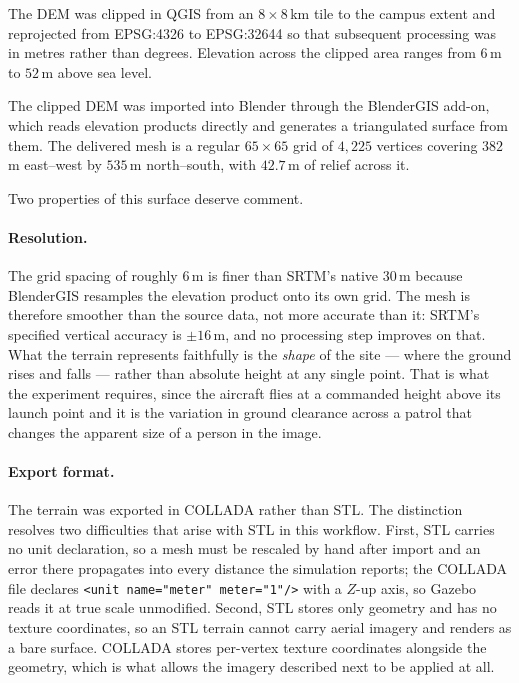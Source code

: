 The DEM was clipped in QGIS from an $8 \times 8$\,km tile to the campus
extent and reprojected from EPSG:4326 to EPSG:32644 so that subsequent
processing was in metres rather than degrees. Elevation across the clipped
area ranges from $6$\,m to $52$\,m above sea level.

The clipped DEM was imported into Blender through the BlenderGIS add-on,
which reads elevation products directly and generates a triangulated surface
from them. The delivered mesh is a regular $65 \times 65$ grid of $4{,}225$
vertices covering $382$\,m east--west by $535$\,m north--south, with
$42.7$\,m of relief across it.

Two properties of this surface deserve comment.

\paragraph{Resolution.}
The grid spacing of roughly $6$\,m is finer than SRTM's native $30$\,m
because BlenderGIS resamples the elevation product onto its own grid. The
mesh is therefore smoother than the source data, not more accurate than it:
SRTM's specified vertical accuracy is $\pm 16$\,m, and no processing step
improves on that. What the terrain represents faithfully is the \emph{shape}
of the site --- where the ground rises and falls --- rather than absolute
height at any single point. That is what the experiment requires, since the
aircraft flies at a commanded height above its launch point and it is the
variation in ground clearance across a patrol that changes the apparent size
of a person in the image.

\paragraph{Export format.}
The terrain was exported in COLLADA rather than STL. The distinction
resolves two difficulties that arise with STL in this workflow. First, STL
carries no unit declaration, so a mesh must be rescaled by hand after import
and an error there propagates into every distance the simulation reports;
the COLLADA file declares \texttt{<unit name="meter" meter="1"/>} with a
$Z$-up axis, so Gazebo reads it at true scale unmodified. Second, STL stores
only geometry and has no texture coordinates, so an STL terrain cannot carry
aerial imagery and renders as a bare surface. COLLADA stores per-vertex
texture coordinates alongside the geometry, which is what allows the imagery
described next to be applied at all.

